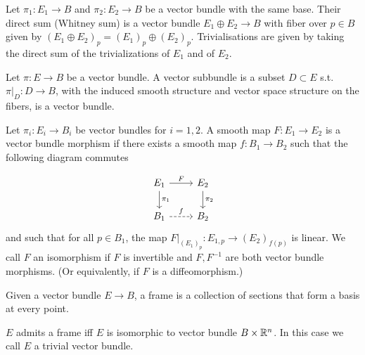 
\begin{remark}
    Let $\pi_1: E_1 \to  B$ and $\pi_2: E_2 \to B$ be a vector bundle with the same base.
    Their direct sum (Whitney sum) is a vector bundle $E_1 \oplus E_2 \to  B$ with fiber over $p \in B$ given by $(E_1 \oplus E_2)_p = (E_1)_p \oplus (E_2)_p$.
    Trivialisations are given by taking the direct sum of the trivializations of $E_1$ and of $E_2$.
\end{remark}

\begin{definition}
    Let $\pi: E \to  B$ be a vector bundle.
    A vector subbundle is a subset $D \subset E$ s.t. $\pi|_D: D \to  B$, with the induced smooth structure and vector space structure on the fibers, is a vector bundle.

\end{definition}

\begin{definition}
    Let $\pi_i: E_i \to  B_i$ be vector bundles for $i = 1, 2$.
   A smooth map  $F: E_1 \to  E_2$ is a vector bundle morphism if there exists a smooth map $f: B_1 \to  B_2$ such that the following diagram commutes

    \[
        \begin{tikzcd}
            E_1 \arrow[d, "\pi_1"] \arrow[r, "F"] & E_2 \arrow[d, "\pi_2"]\\
            B_1 \arrow[r, dashed, "f"]& B_2
        \end{tikzcd}
    \]
and such that  for all $p \in B_1$, the map $F|_{(E_1)_p}: E_{1, p} \to  (E_2)_{f(p)}$ is linear.
    We call $F$ an isomorphism if $F$ is invertible and $F, F^{-1}$ are both vector bundle morphisms. (Or equivalently, if $F$ is a diffeomorphism.)
\end{definition}

\begin{definition}[Frame]
    Given a vector bundle $E \to B$, a frame is a collection of sections that form a basis at every point.
\end{definition}
\begin{remark}
    $E$ admits a frame iff $E$ is isomorphic to   vector bundle  $B \times \mathbb{R}^n$.
In this case we call $E$ a trivial vector bundle.
\end{remark}

